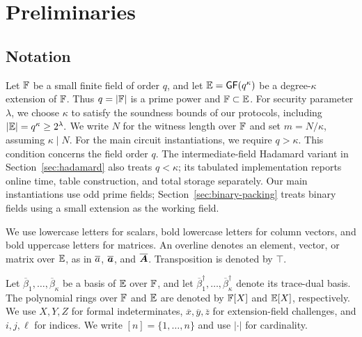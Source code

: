 \section{Preliminaries}


\subsection{Notation}
\label{sec:notation}
Let \({\mathbb{F}}\) be a small finite field of order \(q\), and let
\(\mathbb{E}=\mathsf{GF}(q^\kappa)\) be a degree-\(\kappa\)
extension of \({\mathbb{F}}\). Thus \(q=|{\mathbb{F}}|\) is a prime power
and \({\mathbb{F}}\subset\mathbb{E}\).
For security parameter \(\lambda\), we choose \(\kappa\) to
satisfy the soundness bounds of our protocols, including
\(
    \lvert\mathbb{E}\rvert
    =
    q^\kappa
    \geq
    2^\lambda.
\)
We write \(N\) for the witness length over \({\mathbb{F}}\) and set
\(m=N/\kappa\), assuming \(\kappa\mid N\).
For the main circuit instantiations, we require \(q>\kappa\).
This condition concerns the field order \(q\).
The intermediate-field Hadamard variant in
Section~\ref{sec:hadamard} also treats \(q<\kappa\); its tabulated
implementation reports online time, table construction, and total
storage separately.
Our main instantiations use odd prime fields;
Section~\ref{sec:binary-packing} treats binary fields using a small
extension as the working field.

We use lowercase letters for scalars, bold lowercase letters for
column vectors, and bold uppercase letters for matrices.
An overline denotes an element, vector, or matrix over
\(\mathbb{E}\), as in \(\overline{a}\), \(\overline{\bm a}\), and
\(\overline{\bm A}\). Transposition is denoted by \(\top\).

Let
\(\overline{\beta}_1,\ldots,\overline{\beta}_\kappa\)
be a basis of \(\mathbb{E}\) over \({\mathbb{F}}\), and let
\(\overline{\beta}_1^\dagger,\ldots,
\overline{\beta}_\kappa^\dagger\)
denote its trace-dual basis.
The polynomial rings over \({\mathbb{F}}\) and \(\mathbb{E}\) are
denoted by \({\mathbb{F}}[X]\) and \(\mathbb{E}[X]\), respectively.
We use \(X,Y,Z\) for formal indeterminates,
\(\overline{x},\overline{y},\overline{z}\) for extension-field
challenges, and \(i,j,\ell\) for indices.
We write $[n]=\{1,\ldots,n\}$ and use $|\cdot|$ for cardinality.


